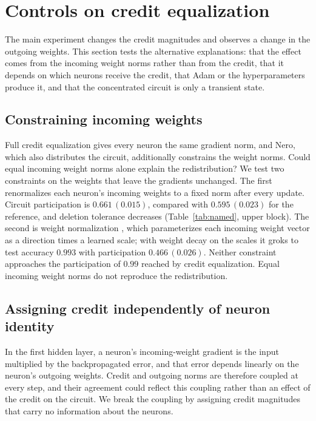 \documentclass{article} %
\begin{document}
\section{Controls on credit equalization}
\label{app:credit_controls}
The main experiment changes the credit magnitudes and observes a change in the outgoing weights. This section tests the alternative explanations: that the effect comes from the incoming weight norms rather than from the credit, that it depends on which neurons receive the credit, that Adam or the hyperparameters produce it, and that the concentrated circuit is only a transient state.

\subsection{Constraining incoming weights}
\label{app:named}
Full credit equalization gives every neuron the same gradient norm, and Nero, which also distributes the circuit, additionally constrains the weight norms. Could equal incoming weight norms alone explain the redistribution? We test two constraints on the weights that leave the gradients unchanged. The first renormalizes each neuron's incoming weights to a fixed norm after every update. Circuit participation is $0.661\,(0.015)$, compared with $0.595\,(0.023)$ for the reference, and deletion tolerance decreases (Table~\ref{tab:named}, upper block). The second is weight normalization \citep{salimans2016weightnorm}, which parameterizes each incoming weight vector as a direction times a learned scale; with weight decay on the scales it groks to test accuracy $0.993$ with participation $0.466\,(0.026)$. Neither constraint approaches the participation of $0.99$ reached by credit equalization. Equal incoming weight norms do not reproduce the redistribution.

\subsection{Assigning credit independently of neuron identity}
\label{app:imposed}
In the first hidden layer, a neuron's incoming-weight gradient is the input multiplied by the backpropagated error, and that error depends linearly on the neuron's outgoing weights. Credit and outgoing norms are therefore coupled at every step, and their agreement could reflect this coupling rather than an effect of the credit on the circuit. We break the coupling by assigning credit magnitudes that carry no information about the neurons.
\end{document}
